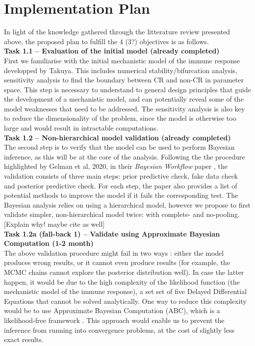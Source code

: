 \documentclass[11pt]{article}
\begin{document}
\section{Implementation Plan}\label{sec:plan}
In light of the knowledge gathered through the litterature review presented above, the proposed plan to fulfill the 4 (3?) objectives is as follows.\\[12pt]
%
\noindent\textbf{Task 1.1 -- Evaluation of the initial model (already completed)}\\
First we familiarise with the initial mechanistic model of the immune response developped by Takuya. This includes numerical stability/bifurcation analysis, sensitivity analysis to find the boundary between CR and non-CR in parameter space. This step is necessary to understand to general design principles that guide the development of a mechanistic model, and can potentially reveal some of the model weaknesses that need to be addressed. The sensitivity analysis is also key to reduce the dimensionality of the problem, since the model is otherwise too large and would result in intractable computations.\\[12pt]
%
\noindent\textbf{Task 1.2 -- Non-hierarchical model validation (already completed)}\\ 
The second step is to verify that the model can be used to perform Bayesian inference, as this will be at the core of the analysis. Following the the procedure highlighted by Gelman et al, 2020, in their \textit{Bayesian Workflow} paper \cite{gelman2020bayesian}, the validation consists of three main steps: prior predictive check, fake data check and posterior predictive check. For each step, the paper also provides a list of potential methods to improve the model if it fails the corresponding test. The Bayesian analysis relies on using a hierarchical model, however we propose to first validate simpler, non-hierarchical model twice: with complete- and no-pooling. [Explain why! maybe cite as well]\\[12pt]
%
\noindent\textbf{Task 1.2a (fall-back 1) -- Validate using Approximate Bayesian Computation (1-2 month)}\\ 
The above validation procedure might fail in two ways : either the model produces wrong results, or it cannot even produce results (for example, the MCMC chains cannot explore the posterior distribution well). In case the latter happen, it would be due to the high complexity of the likelihood function (the mechanistic model of the immune response), a set set of five Delayed Differential Equations that cannot be solved analytically. One way to reduce this complexity would be to use Approximate Bayesian Computation (ABC), which is a likelihood-free framework \cite{ABCtuber}. This approach would enable us to prevent the inference from running into convergence problems, at the cost of slightly less exact results. \\[12pt]
\end{document}
